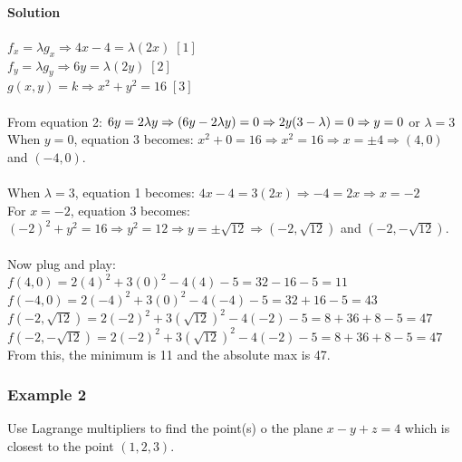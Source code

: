 \documentclass{article}
\begin{document}
\paragraph{Solution} $f_x=\lambda g_x\Rightarrow 4x-4=\lambda(2x)\;[1]$
\\$f_y=\lambda g_y\Rightarrow 6y=\lambda(2y)\;[2]$
\\$g(x,y)=k\Rightarrow x^2+y^2=16\;[3]$
\\\\From equation 2: $6y=2\lambda y\Rightarrow (6y-2\lambda y)=0\\\Rightarrow2y(3-\lambda)=0\Rightarrow y=0$ or $\lambda=3$
\\When $y=0$, equation 3 becomes: $x^2+0=16\Rightarrow x^2=16\Rightarrow x=\pm4\Rightarrow(4,0)$ and $(-4,0)$.
\\\\When $\lambda=3$, equation 1 becomes: $4x-4=3(2x)\Rightarrow -4=2x\Rightarrow x=-2$
\\For $x=-2$, equation 3 becomes: $(-2)^2+y^2=16\Rightarrow y^2=12\Rightarrow y=\pm\sqrt{12}\Rightarrow(-2,\sqrt{12})$ and $(-2,-\sqrt{12})$.
\\\\Now plug and play:
\\$f(4,0)=2(4)^2+3(0)^2-4(4)-5=32-16-5=11$
\\$f(-4,0)=2(-4)^2+3(0)^2-4(-4)-5=32+16-5=43$
\\$f(-2,\sqrt{12})=2(-2)^2+3(\sqrt{12})^2-4(-2)-5=8+36+8-5=47$
\\$f(-2,-\sqrt{12})=2(-2)^2+3(\sqrt{12})^2-4(-2)-5=8+36+8-5=47$
\\From this, the minimum is 11 and the absolute max is 47.

\subsubsection{Example 2}
Use Lagrange multipliers to find the point(s) o the plane $x-y+z=4$ which is closest to the point $(1,2,3)$.
\end{document}
